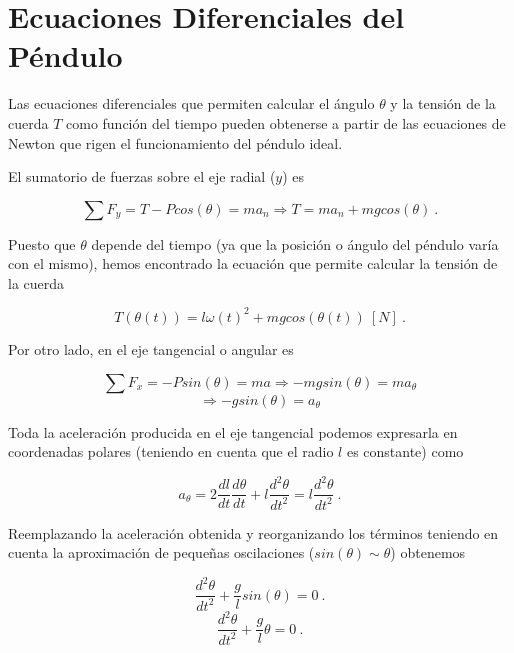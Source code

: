 \documentclass[journal]{IEEEtran}
\begin{document}
\section{Ecuaciones Diferenciales del Péndulo}

Las ecuaciones diferenciales que permiten calcular el ángulo $\theta$ y la tensión de la cuerda $T$ como función del tiempo pueden obtenerse a partir de las ecuaciones de Newton que rigen el funcionamiento del péndulo ideal.

El sumatorio de fuerzas sobre el eje radial ($y$) es

\begin{equation}
  \sum F_y = T - Pcos(\theta) = ma_n \Rightarrow T = ma_n + mgcos(\theta)~.
\end{equation}

Puesto que $\theta$ depende del tiempo (ya que la posición o ángulo del péndulo varía con el mismo), hemos encontrado la ecuación que permite calcular la tensión de la cuerda

\begin{equation}
  T(\theta(t)) = l\omega(t)^2 + mgcos(\theta(t)) ~ [N]~.
\end{equation}

Por otro lado, en el eje tangencial o angular es

\begin{equation}
  \sum F_x = -Psin(\theta) = ma \Rightarrow -mgsin(\theta) = ma_\theta
\end{equation}
\begin{equation}
  \Rightarrow -gsin(\theta) = a_\theta
\end{equation}

Toda la aceleración producida en el eje tangencial podemos expresarla en coordenadas polares (teniendo en cuenta que el radio $l$ es constante) como

\begin{equation}
  a_\theta = 2\displaystyle\frac{dl}{dt}\displaystyle\frac{d\theta}{dt} + l\displaystyle\frac{d^2\theta}{dt^2} = l\displaystyle\frac{d^2\theta}{dt^2}~.
\end{equation}

Reemplazando la aceleración obtenida y reorganizando los términos teniendo en cuenta la aproximación de pequeñas oscilaciones ($sin(\theta) \sim \theta$) obtenemos

\begin{equation}
  \displaystyle\frac{d^2\theta}{dt^2} + \displaystyle\frac{g}{l}sin(\theta) = 0 ~.
\end{equation}
\begin{equation}
  \displaystyle\frac{d^2\theta}{dt^2} + \displaystyle\frac{g}{l}\theta = 0 ~.
\end{equation}
\end{document}
